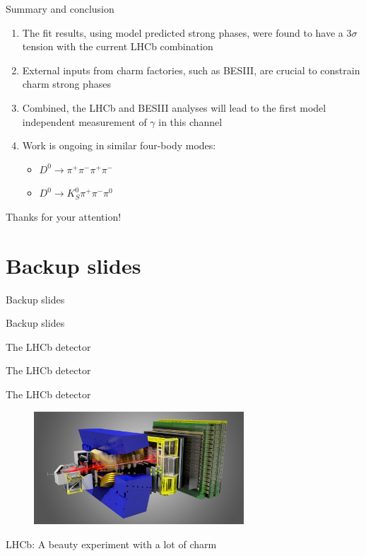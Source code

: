 \documentclass{beamer}
\begin{document}
\begin{frame}{Summary and conclusion}
  \begin{enumerate}
    \setlength\itemsep{1.0em}
    \setcounter{enumi}{4}
    \item{The fit results, using model predicted strong phases, were found to have a $3\sigma$ tension with the current LHCb combination}
    \item{External inputs from charm factories, such as BESIII, are crucial to constrain charm strong phases}
    \item{Combined, the LHCb and BESIII analyses will lead to the first model independent measurement of $\gamma$ in this channel}
    \item{Work is ongoing in similar four-body modes:}
    \begin{itemize}
      \item{$D^0\to\pi^+\pi^-\pi^+\pi^-$}
      \item{$D^0\to K_S^0\pi^+\pi^-\pi^0$}
    \end{itemize}
  \end{enumerate}
  \vspace{0.2cm}
  \begin{center}
    {\huge Thanks for your attention!}
  \end{center}
\end{frame}

\section{Backup slides}
\begin{frame}{Backup slides}
  \begin{center}
    {\huge Backup slides}
  \end{center}
\end{frame}

\begin{frame}{The LHCb detector}
  \begin{center}
    {\huge The LHCb detector}
  \end{center}
\end{frame}

\begin{frame}{The LHCb detector}
  \begin{figure}
    \centering
    \includegraphics[width = 0.7\textwidth]{Plots/LHCbDetector.png}
  \end{figure}
  \begin{center}
    \Large LHCb: A beauty experiment with a lot of charm
  \end{center}
\end{frame}
\end{document}
